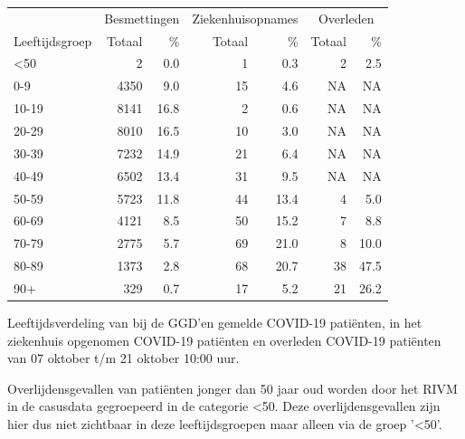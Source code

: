 \documentclass[
  english,
  man,floatsintext]{apa6}
\begin{document}
\begin{table}
\centering\begingroup\fontsize{11}{13}\selectfont

\begin{threeparttable}
\begin{tabular}{lrrrrrr}
\toprule
\multicolumn{1}{c}{ } & \multicolumn{2}{c}{Besmettingen} & \multicolumn{2}{c}{Ziekenhuisopnames} & \multicolumn{2}{c}{Overleden} \\
\cmidrule(l{3pt}r{3pt}){2-3} \cmidrule(l{3pt}r{3pt}){4-5} \cmidrule(l{3pt}r{3pt}){6-7}
Leeftijdsgroep & Totaal & \% & Totaal & \% & Totaal & \%\\
\midrule
<50 & 2 & 0.0 & 1 & 0.3 & 2 & 2.5\\
0-9 & 4350 & 9.0 & 15 & 4.6 & NA & NA\\
10-19 & 8141 & 16.8 & 2 & 0.6 & NA & NA\\
20-29 & 8010 & 16.5 & 10 & 3.0 & NA & NA\\
30-39 & 7232 & 14.9 & 21 & 6.4 & NA & NA\\
40-49 & 6502 & 13.4 & 31 & 9.5 & NA & NA\\
50-59 & 5723 & 11.8 & 44 & 13.4 & 4 & 5.0\\
60-69 & 4121 & 8.5 & 50 & 15.2 & 7 & 8.8\\
70-79 & 2775 & 5.7 & 69 & 21.0 & 8 & 10.0\\
80-89 & 1373 & 2.8 & 68 & 20.7 & 38 & 47.5\\
90+ & 329 & 0.7 & 17 & 5.2 & 21 & 26.2\\
\bottomrule
\end{tabular}
\begin{tablenotes}
\item[1] Leeftijdsverdeling van bij de GGD’en gemelde COVID-19 patiënten, in het ziekenhuis opgenomen COVID-19 patiënten en overleden COVID-19 patiënten van 07 oktober t/m 21 oktober 10:00 uur.
\item[2] Overlijdensgevallen van patiënten jonger dan 50 jaar oud worden door het RIVM in de casusdata gegroepeerd in de categorie <50. Deze overlijdensgevallen zijn hier dus niet zichtbaar in deze leeftijdsgroepen maar alleen via de groep '<50'.
\end{tablenotes}
\end{threeparttable}
\endgroup{}
\end{table}

\newpage
\end{document}
